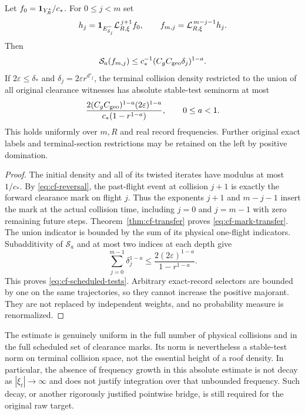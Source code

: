 \begin{corollary}
\label{cor:cf-all-depth-tests}
Let $f_0=\mathbf1_{Y_R^*}/c_*$. For $0\le j<m$ set
\[
 h_j=\mathbf1_{E_{\delta_j}^-}\mathcal L_{R,\xi}^{\,j+1}f_0,
 \qquad
 f_{m,j}=\mathcal L_{R,\xi}^{\,m-j-1}h_j.
\]
Then
\begin{equation}\label{eq:cf-mark-transfer}
 \mathcal S_a(f_{m,j})\le
  c_*^{-1}(C_gC_{\rm geo}\delta_j)^{1-a}.
\end{equation}
If $2\varepsilon\le\delta_*$ and
$\delta_j=2\varepsilon r^{d'_j}$, the terminal collision density
restricted to the union of all original clearance witnesses has
absolute stable-test seminorm at most
\begin{equation}\label{eq:cf-scheduled-tests}
 \frac{2(C_gC_{\rm geo})^{1-a}(2\varepsilon)^{1-a}}
             {c_*(1-r^{1-a})},\qquad 0\le a<1.
\end{equation}
This holds uniformly over $m,R$ and real record frequencies. Further
original exact labels and terminal-section restrictions may be
retained on the left by positive domination.
\end{corollary}
\begin{proof}
The initial density and all of its twisted iterates have modulus at
most $1/c_*$. By \eqref{eq:cf-reversal}, the past-flight event at
collision $j+1$ is exactly the forward clearance mark on flight $j$.
Thus the exponents $j+1$ and $m-j-1$ insert the mark at the actual
collision time, including $j=0$ and $j=m-1$ with zero remaining
future steps. Theorem~\ref{thm:cf-transfer} proves
\eqref{eq:cf-mark-transfer}. The union indicator is bounded by the
sum of its physical one-flight indicators. Subadditivity of
$\mathcal S_a$ and at most two indices at each depth give
\[
 \sum_{j=0}^{m-1}\delta_j^{1-a}
      \le\frac{2(2\varepsilon)^{1-a}}{1-r^{1-a}}.
\]
This proves \eqref{eq:cf-scheduled-tests}. Arbitrary exact-record
selectors are bounded by one on the same trajectories, so they
cannot increase the positive majorant. They are not replaced by
independent weights, and no probability measure is renormalized.
\end{proof}

The estimate is genuinely uniform in the full number of physical
collisions and in the full scheduled set of clearance marks. Its
norm is nevertheless a stable-test norm on terminal collision space,
not the essential height of a roof density. In particular, the absence
of frequency growth in this absolute estimate is not decay as
$|\xi_t|\to\infty$ and does not justify integration over that
unbounded frequency. Such decay, or another rigorously justified
pointwise bridge, is still required for the original raw target.
